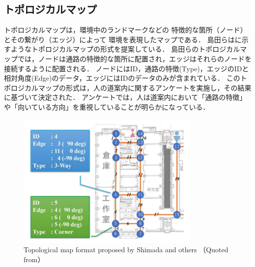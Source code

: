\subsection{トポロジカルマップ}
トポロジカルマップは，環境中のランドマークなどの
特徴的な箇所（ノード）とその繋がり（エッジ）によって
環境を表現したマップである．
島田らはに示すようなトポロジカルマップの形式\cite{shimada2020}を提案している．
島田らのトポロジカルマップでは，ノードは通路の特徴的な箇所に配置され，エッジはそれらのノードを接続するように配置される．
ノードにはID，通路の特徴(Type)，エッジのIDと相対角度(Edge)のデータ，エッジにはIDのデータのみが含まれている．
このトポロジカルマップの形式は，人の道案内に関するアンケートを実施し，その結果に基づいて決定された．
アンケートでは，人は道案内において「通路の特徴」や「向いている方向」を重視していることが明らかになっている．
\begin{figure}[htbp]
    \centering
     \includegraphics[width=90mm]{images/pdf/topo.pdf}
     \caption{Topological map format proposed by Shimada and others （Quoted from\cite{shimada2020}）}
     \label{fig:topo}
\end{figure}
\clearpage
